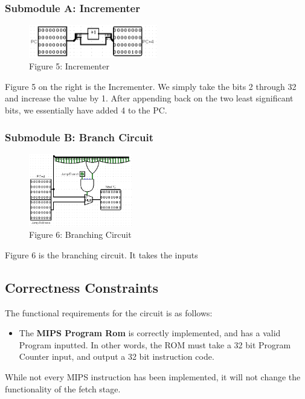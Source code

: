 \documentclass{article}
\begin{document}
\subsubsection{Submodule A: Incrementer}
\begin{figure}
\vspace{-1.4cm}
\begin{center}
\includegraphics[width=0.5\textwidth]{Incrementer.png}\\
Figure 5: Incrementer
\end{center}
\vspace{-13mm}
\end{figure}
Figure 5 on the right is the Incrementer. We simply take the bits 2 through 32 and increase the value by 1. After appending back on the two least significant bits, we essentially have added 4 to the PC.

\subsubsection{Submodule B: Branch Circuit}
\begin{figure}
\vspace{-1cm}
\begin{center}
\includegraphics[width=0.4\textwidth]{FetchBranch.png} \\
Figure 6: Branching Circuit
\end{center}
\vspace{-1cm}
\end{figure}
Figure 6 is the branching circuit. It takes the inputs \

\subsection{Correctness Constraints}
The functional requirements for the circuit is as follows:
\begin{itemize}
\item
The \textbf{MIPS Program Rom} is correctly implemented, and has a valid Program inputted. In other words, the ROM must take a 32 bit Program Counter input, and output a 32 bit instruction code. 
\end{itemize}
While not every MIPS instruction has been implemented, it will not change the functionality of the fetch stage. 
\end{document}
